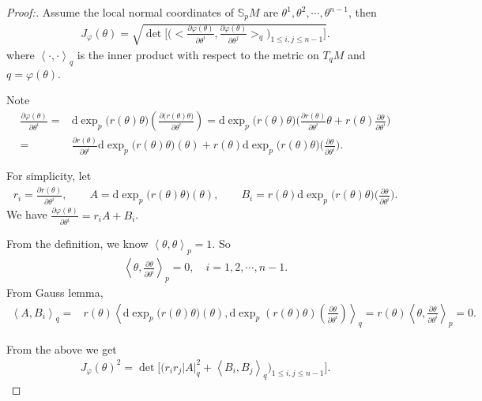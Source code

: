 \documentclass[11pt]{amsart}
\numberwithin{equation}{section}
\renewcommand{\d}{\mathrm{d}}
\newcommand{\bracket}[1]{\ensuremath{\left<#1\right>}}
\begin{document}
\begin{proof}[Proof:] Assume the local normal coordinates of $\mathbb{S}_pM$ are $\theta^1,\theta^2,\cdots,\theta^{n-1}$, then
\begin{align*}
        J_\varphi(\theta)=\sqrt{\det\Bigg[\Bigg(\Big<\frac{\partial \varphi(\theta)}{\partial \theta^i},\frac{\partial \varphi(\theta)}{\partial \theta^j}\Big>_q\Bigg)_{1\leq i,j\leq n-1}\Bigg]}.
    \end{align*}
where $\bracket{\cdot,  \cdot}_q$ is the inner product with respect to the metric on $T_{q}M$ and $q= \varphi(\theta)$.

Note
    \begin{align*}
        \frac{\partial \varphi(\theta)}{\partial \theta^i}=&\d\exp_p\big(r(\theta)\theta\big)\left(\frac{\partial \big(r(\theta)\theta\big)}{\partial \theta^i}\right) =\d\exp_p\big(r(\theta)\theta\big)\bigg(\frac{\partial r(\theta)}{\partial \theta^i}\theta + r(\theta)\frac{\partial\theta}{\partial \theta^i}\bigg)\\
        =&\frac{\partial r(\theta)}{\partial \theta^i}\d\exp_p\big(r(\theta)\theta\big)(\theta) + r(\theta)\d\exp_p\big(r(\theta)\theta\big)\bigg(\frac{\partial\theta}{\partial \theta^i}\bigg).
    \end{align*} 
    
    For simplicity, let
    \begin{align*}
        r_i=\frac{\partial r(\theta)}{\partial \theta^i},\quad \quad  A= \d\exp_p\big(r(\theta)\theta\big)(\theta), \quad \quad 
        B_i=r(\theta)\d\exp_p\big(r(\theta)\theta\big)\bigg(\frac{\partial\theta}{\partial \theta^i}\bigg).
    \end{align*}
We have $\displaystyle  \frac{\partial \varphi(\theta)}{\partial \theta^i}=r_iA+B_i$. 

    From the definition, we know $\bracket{\theta,\theta}_p=1$. So
    \begin{align*}
        \bracket{\theta,\frac{\partial \theta}{\partial \theta^i}}_p=0, \quad i = 1,2,\cdots,n-1.
    \end{align*}
    From Gauss lemma, 
    \begin{align*}
        \bracket{A,B_i}_q=&r(\theta)\bracket{\d\exp_p\big(r(\theta)\theta\big)(\theta),\d\exp_p(r(\theta)\theta)\left(\frac{\partial \theta}{\partial \theta^i}\right)}_q        =r(\theta)\bracket{\theta,\frac{\partial \theta}{\partial \theta^i}}_p=0.
    \end{align*}

 From the above we get 
    \begin{align*}
        J_\varphi(\theta)^2=\det\Big[\Big(r_ir_j |A|_q^2+\bracket{B_i,B_j}_q\Big)_{1\leq i,j\leq n-1}\Big].
    \end{align*}


\end{proof}
\end{document}
